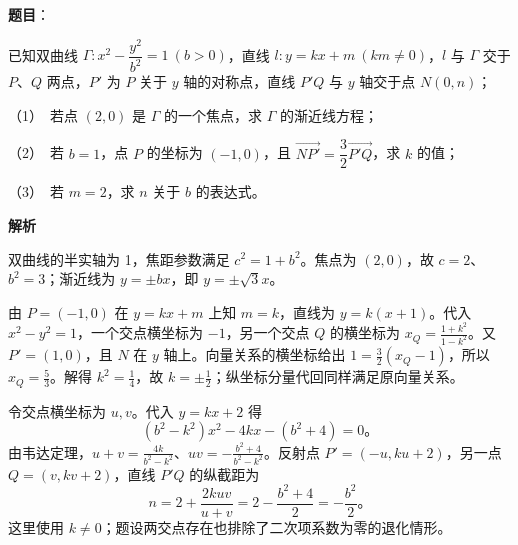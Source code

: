 \begin{answer}

\textbf{题目}：

已知双曲线 $\Gamma:x^2-\dfrac{y^2}{b^2}=1\ (b>0)$，直线 $l:y=kx+m\ (km\ne0)$，$l$ 与 $\Gamma$ 交于 $P\text{、}Q$ 两点，$P'$ 为 $P$ 关于 $y$ 轴的对称点，直线 $P'Q$ 与 $y$ 轴交于点 $N(0,n)$；

（1）　若点 $(2,0)$ 是 $\Gamma$ 的一个焦点，求 $\Gamma$ 的渐近线方程；

（2）　若 $b=1$，点 $P$ 的坐标为 $(-1,0)$，且 $\overrightarrow{NP'}=\dfrac32\overrightarrow{P'Q}$，求 $k$ 的值；

（3）　若 $m=2$，求 $n$ 关于 $b$ 的表达式。

\textbf{解析}


双曲线的半实轴为 1，焦距参数满足 $c^2=1+b^2$。焦点为 $(2,0)$，故 $c=2$、$b^2=3$；渐近线为 $y=\pm bx$，即 $y=\pm\sqrt3x$。


由 $P=(-1,0)$ 在 $y=kx+m$ 上知 $m=k$，直线为 $y=k(x+1)$。代入 $x^2-y^2=1$，一个交点横坐标为 $-1$，另一个交点 $Q$ 的横坐标为 $x_Q=\frac{1+k^2}{1-k^2}$。又 $P'=(1,0)$，且 $N$ 在 $y$ 轴上。向量关系的横坐标给出 $1=\frac32(x_Q-1)$，所以 $x_Q=\frac53$。解得 $k^2=\frac14$，故 $k=\pm\frac12$；纵坐标分量代回同样满足原向量关系。


令交点横坐标为 $u,v$。代入 $y=kx+2$ 得
\nopagebreak[4]
\[
(b^2-k^2)x^2-4kx-(b^2+4)=0\mbox{。}
\]
由韦达定理，$u+v=\frac{4k}{b^2-k^2}$、$uv=-\frac{b^2+4}{b^2-k^2}$。反射点 $P'=(-u,ku+2)$，另一点 $Q=(v,kv+2)$，直线 $P'Q$ 的纵截距为
\nopagebreak[4]
\[
n=2+\frac{2kuv}{u+v}
=2-\frac{b^2+4}{2}
=-\frac{b^2}{2}\mbox{。}
\]
这里使用 $k\ne0$；题设两交点存在也排除了二次项系数为零的退化情形。




\end{answer}
